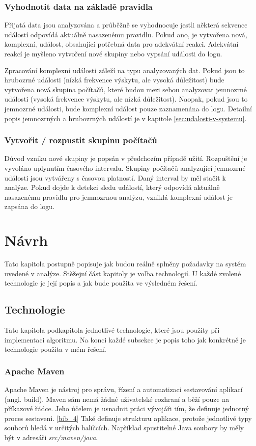 \documentclass[
  digital, %
  table,   %
  nolof,     %
  nolot,     %
  oneside, %
  nocover,
  monochrome,
  12pt
]{fithesis3}
\begin{document}
\subsection*{Vyhodnotit data na základě pravidla}
Přijatá data jsou analyzována a průběžně se vyhodnocuje jestli některá sekvence událostí odpovídá aktuálně nasazenému pravidlu. Pokud ano, je vytvořena nová, komplexní, událost, obsahující potřebná data pro adekvátní reakci. Adekvátní reakcí je myšleno vytvoření nové skupiny nebo vypsání události do logu.

Zpracování komplexní události záleží na typu analyzovaných dat. Pokud jsou to hrubozrné události (nízká frekvence výskytu, ale vysoká důležitost) bude vytvořena nová skupina počítačů, které budou mezi sebou analyzovat jemnozrné události (vysoká frekvence výskytu, ale nízká důležitost). Naopak, pokud jsou to jemnozrné události, bude komplexní událost pouze zaznamenána do logu. Detailní popis jemnozrných a hrubozrných událostí je v kapitole \ref{sec:udalosti-v-systemu}.

\subsection*{Vytvořit / rozpustit skupinu počítačů}
Důvod vzniku nové skupiny je popsán v předchozím případě užití. Rozpuštění je vyvoláno uplynutím časového intervalu. Skupiny počítačů analyzující jemnozrné události jsou vytvářeny s časovou platností. Daný interval by měl stačit k analýze. Pokud dojde k detekci sledu událostí, který odpovídá aktuálně nasazenému pravidlu pro jemnozrnou analýzu, vzniklá komplexní událost je zapsána do logu.

\chapter{Návrh}
Tato kapitola postupně popisuje jak budou reálně splněny požadavky na systém uvedené v analýze. Stěžejní část kapitoly je volba technologií. U každé zvolené technologie je její popis a jak bude použita ve výsledném řešení.

\section{Technologie}
Tato kapitola podkapitola jednotlivé technologie, které jsou použity při implementaci algoritmu. Na konci každé subsekce je popis toho jak konkrétně je technologie použita v mém řešení.

\subsection{Apache Maven}
Apache Maven je nástroj pro správu, řízení a automatizaci sestavování aplikací (angl. build). Maven sám nemá žádné uživatelské rozhraní a běží pouze na příkazové řádce. Jeho účelem je usnadnit práci vývojáři tím, že definuje jednotný proces sestavení. \ref{bib_4} Také definuje strukturu aplikace, protože jednotlivé typy souborů hledá v určitých balíčcích. Například spustitelné Java soubory by měly být v adresáři \textit{src/maven/java}.
\end{document}
